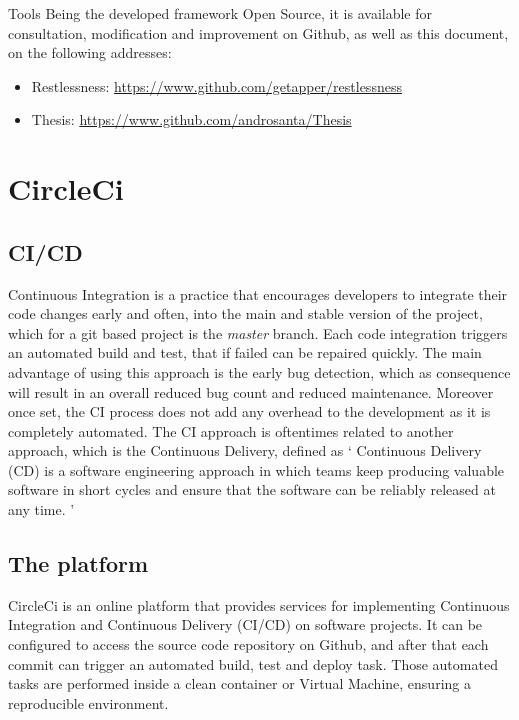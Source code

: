 \begin{chapter}{Tools}
    \bigskip
    \bigskip
    \noindent
    Being the developed framework Open Source, it is available for consultation,
    modification and improvement on Github, as well as this document, on the
    following addresses:
    \begin{itemize}
        \item Restlessness: \url{https://www.github.com/getapper/restlessness}
        \item Thesis: \url{https://www.github.com/androsanta/Thesis}
    \end{itemize}

    \section{CircleCi}

    \subsection{CI/CD}
    Continuous Integration is a practice that encourages developers to integrate
    their code changes early and often, into the main and stable version of the
    project, which for a git based project is the \textit{master} branch.
    Each code integration triggers an automated build and test, that if failed can
    be repaired quickly.
    The main advantage of using this approach is the early bug detection, which
    as consequence will result in an overall reduced bug count and reduced
    maintenance. Moreover once set, the CI process does not add any overhead to
    the development as it is completely automated.
    The CI approach is oftentimes related to another approach, which is the
    Continuous Delivery, defined as
    \enquote*{
        Continuous Delivery (CD) is a software engineering approach in which teams
        keep producing valuable software in short cycles and ensure that the
        software can be reliably released at any time.%
    } \cite{continuous_delivery}

    \subsection{The platform}
    CircleCi is an online platform that provides services for implementing
    Continuous Integration and Continuous Delivery (CI/CD) on software projects.
    It can be configured to access the source code repository on Github, and after
    that each commit can trigger an automated build, test and deploy task.
    Those automated tasks are performed inside a clean container or Virtual Machine,
    ensuring a reproducible environment.


\end{chapter}
